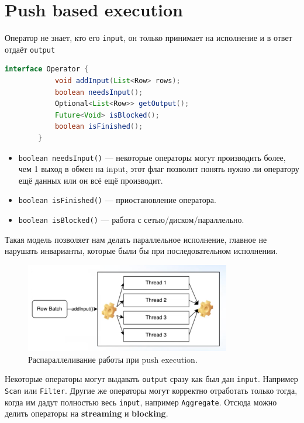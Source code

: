 \documentclass[11pt]{article}
\begin{document}
    \newpage

    \section*{Push based execution}

    Оператор не знает, кто его \texttt{input}, он только принимает на исполнение и в ответ отдаёт \texttt{output}

    \begin{lstlisting}[language=Java]
        interface Operator {
            void addInput(List<Row> rows);
            boolean needsInput();
            Optional<List<Row>> getOutput();
            Future<Void> isBlocked();
            boolean isFinished();
        }
    \end{lstlisting}

    \begin{itemize}
        \item \texttt{boolean needsInput()} --- некоторые операторы могут производить более, чем 1 выход в обмен на input, этот флаг позволит понять нужно ли оператору ещё данных или он всё ещё производит.
        \item \texttt{boolean isFinished()} --- приостановление оператора.
        \item \texttt{boolean isBlocked()} --- работа с сетью/диском/параллельно.
    \end{itemize}

    Такая модель позволяет нам делать параллельное исполнение, главное не нарушать инварианты, которые были бы при последовательном исполнении.

    \begin{figure}[h!]
        \centering
        \includegraphics[width=0.8\textwidth]{Pictures/Push/Push parallelism}
        \caption{Распараллеливание работы при push execution.}
    \end{figure}

    Некоторые операторы могут выдавать \texttt{output} сразу как был дан \texttt{input}.
    Например \texttt{Scan} или \texttt{Filter}.
    Другие же операторы могут корректно отработать только тогда, когда им дадут полностью весь \texttt{input}, например \texttt{Aggregate}.
    Отсюда можно делить операторы на \textbf{streaming} и \textbf{blocking}.
\end{document}
